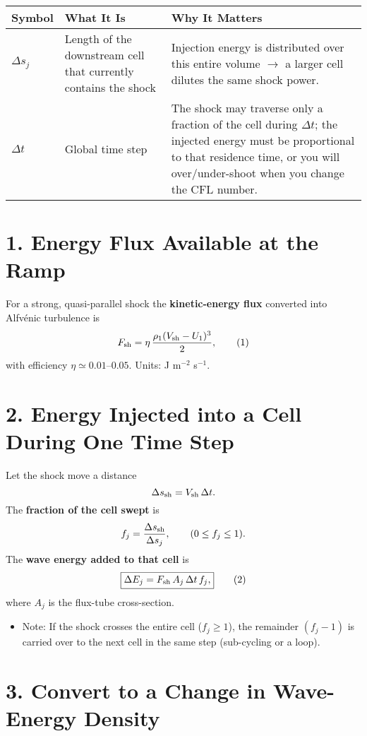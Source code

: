\begin{table}[h!]
\centering
\begin{tabular}{|p{3cm}|p{6.5cm}|p{6.5cm}|}
\hline
\textbf{Symbol} & \textbf{What It Is} & \textbf{Why It Matters} \\
\hline
$\Delta s_j$ & Length of the downstream cell that currently contains the shock & Injection energy is distributed over this entire volume $\rightarrow$ a larger cell dilutes the same shock power. \\
\hline
$\Delta t$ & Global time step & The shock may traverse only a fraction of the cell during $\Delta t$; the injected energy must be proportional to that residence time, or you will over/under-shoot when you change the CFL number. \\
\hline
\end{tabular}
\caption*{}
\end{table}

\section*{1. Energy Flux Available at the Ramp}

For a strong, quasi-parallel shock the \textbf{kinetic-energy flux} converted into Alfvénic turbulence is
\[
F_{\rm sh} = 
\eta \,\frac{\rho_{1}(V_{\rm sh} - U_{1})^{3}}{2},
\tag{1}
\]
with efficiency $\eta \simeq 0.01$–$0.05$. \quad Units: J m$^{-2}$ s$^{-1}$.

\section*{2. Energy Injected into a Cell During One Time Step}

Let the shock move a distance
\[
\Delta s_{\rm sh} = V_{\rm sh}\, \Delta t.
\]
The \textbf{fraction of the cell swept} is
\[
f_j = \frac{\Delta s_{\rm sh}}{\Delta s_j}, \qquad (0 \leq f_j \leq 1).
\]
The \textbf{wave energy added to that cell} is
\[
\boxed{
\Delta E_j = F_{\rm sh}\,A_{j}\,\Delta t\,f_j,
}
\tag{2}
\]
where $A_j$ is the flux-tube cross-section.

\begin{itemize}
\item Note: If the shock crosses the entire cell ($f_j \geq 1$), the remainder $(f_j - 1)$ is carried over to the next cell in the same step (sub-cycling or a loop).
\end{itemize}

\section*{3. Convert to a Change in Wave-Energy \textbf{Density}}

